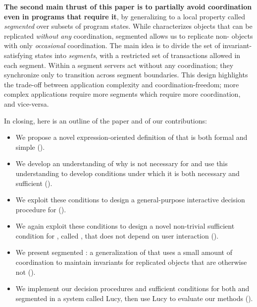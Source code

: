 \textbf{The second main thrust of this paper is to partially avoid coordination even in programs that require it}, by generalizing \invariantconfluence{} to a local property called \emph{segmented \invariantconfluence{}} over subsets of program states. While \invariantconfluence{}
characterizes objects that can be replicated \emph{without any} coordination,
segmented \invariantconfluence{} allows us to replicate
non-\invariantconfluent{} objects with only \emph{occasional} coordination. The main
idea is to divide the set of invariant-satisfying states into \emph{segments}, with a restricted set of transactions allowed in each segment.
Within a segment servers act without any coordination; they synchronize only to
transition across segment boundaries. This design highlights the trade-off
between application complexity and coordination-freedom; more complex
applications require more segments which require more coordination, and
vice-versa.

In closing, here is an outline of the paper and of our contributions:
\begin{itemize}
  \item
    We propose a novel expression-oriented definition of \invariantconfluence{}
    that is both formal and simple ().

  \item
    We develop an understanding of why \invariantclosure{} is not necessary for
    \invariantconfluence{} and use this understanding to develop conditions
    under which it is both necessary and sufficient
    ().

  \item
    We exploit these conditions to design a general-purpose interactive
    decision procedure for \invariantconfluence{}
    ().

  \item
    We again exploit these conditions to design a novel non-trivial sufficient
    condition for \invariantconfluence{}, called \mergereducibility, that does
    not depend on user interaction ().

  \item
    We present segmented \invariantconfluence{}: a generalization of
    \invariantconfluence{} that uses a small amount of coordination to maintain
    invariants for replicated objects that are otherwise not
    \invariantconfluent{} ().

  \item
    We implement our decision procedures and sufficient conditions for both
    \invariantconfluence{} and segmented \invariantconfluence{} in a system
    called Lucy, then use Lucy to evaluate our methods ().
\end{itemize}
